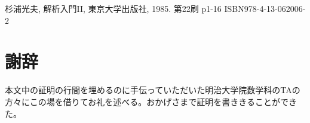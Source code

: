 \documentclass[dvipdfmx]{jsarticle}
\begin{document}
\begin{comment}
\frac{\partial y_{n}}{\partial x_{1}} & \frac{\partial y_{n}}{\partial x_{2}} & \cdots & \frac{\partial y_{n}}{\partial x_{n}} \\
\end{pmatrix} = - \begin{pmatrix}
\frac{\partial f_{1}}{\partial y_{1}} & \frac{\partial f_{1}}{\partial y_{2}} & \cdots & \frac{\partial f_{1}}{\partial y_{n}} \\
\frac{\partial f_{2}}{\partial y_{1}} & \frac{\partial f_{2}}{\partial y_{2}} & \cdots & \frac{\partial f_{2}}{\partial y_{n}} \\
 \vdots & \vdots & \ddots & \vdots \\
\frac{\partial f_{n}}{\partial y_{1}} & \frac{\partial f_{n}}{\partial y_{2}} & \cdots & \frac{\partial f_{n}}{\partial y_{n}} \\
\end{pmatrix}^{- 1}\begin{pmatrix}
\frac{\partial f_{1}}{\partial x_{1}} & \frac{\partial f_{1}}{\partial x_{2}} & \cdots & \frac{\partial f_{1}}{\partial x_{n}} \\
\frac{\partial f_{2}}{\partial x_{1}} & \frac{\partial f_{2}}{\partial x_{2}} & \cdots & \frac{\partial f_{2}}{\partial x_{n}} \\
 \vdots & \vdots & \ddots & \vdots \\
\frac{\partial f_{n}}{\partial x_{1}} & \frac{\partial f_{n}}{\partial x_{2}} & \cdots & \frac{\partial f_{n}}{\partial x_{n}} \\
\end{pmatrix}
\end{align*}
\end{comment}
\begin{thebibliography}{50}
  杉浦光夫, 解析入門II, 東京大学出版社, 1985. 第22刷 p1-16 ISBN978-4-13-062006-2
\end{thebibliography}
\section*{謝辞}%
本文中の証明の行間を埋めるのに手伝っていただいた明治大学院数学科のTAの方々にこの場を借りてお礼を述べる。おかげさまで証明を書ききることができた。
\end{document}
